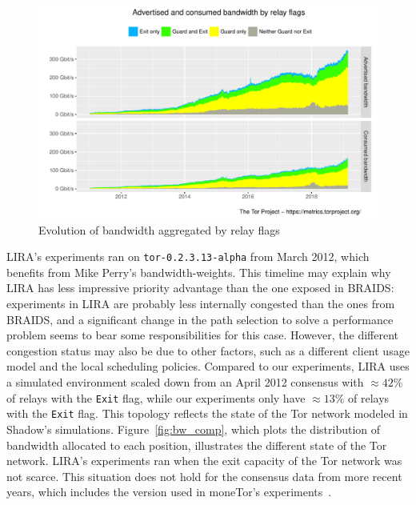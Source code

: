 \begin{figure}
  \includegraphics[scale=0.415]{images/bandwidth-flags-2011-01-01-2019-02-25.pdf}
  \caption{Evolution of bandwidth aggregated by relay
    flags} \label{fig:bw_inequalities}
\end{figure}

LIRA's experiments ran on \texttt{tor-0.2.3.13-alpha} from March 2012, which benefits from Mike Perry's bandwidth-weights.
This timeline may explain why LIRA has less impressive priority advantage than the one exposed in BRAIDS: experiments in LIRA are probably less internally congested than the ones from BRAIDS, and a significant change in the path selection to solve a performance problem seems to bear some responsibilities for this case.
However, the different congestion status may also be due to other factors, such as a different client usage model and the local scheduling policies.
Compared to our experiments, LIRA uses a simulated environment scaled down from an April 2012 consensus with $\approx 42\%$ of relays with the \texttt{Exit} flag, while our experiments only have $\approx 13\%$ of relays with the \texttt{Exit} flag.
This topology reflects the state of the Tor network modeled in Shadow's simulations.
Figure~\ref{fig:bw_comp}, which plots the distribution of bandwidth allocated to each position, illustrates the different state of the Tor network.
LIRA's experiments ran when the exit capacity of the Tor network was not scarce.
This situation does not hold for the consensus data from more recent years, which includes the version used in moneTor's experiments~\cite{waterfilling-pets2017}.

